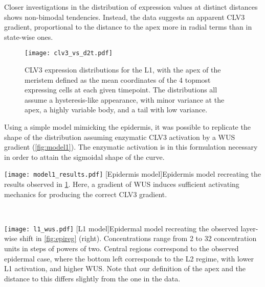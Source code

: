 Closer investigations in the distribution of expression
values at distinct distances shows non-bimodal tendencies. Instead, the data
suggests an apparent CLV3 gradient, proportional to the distance to the apex
more in radial terms than in state-wise ones.

\begin{figure}[H]
  \centering
\texttt{[image: clv3\_vs\_d2t.pdf]}
  \caption[CLV3 distributions]{CLV3 expression distributions for the L1, with the apex of the
    meristem defined as the mean coordinates of the 4 topmost expressing cells
    at each given timepoint. The distributions all assume a hysteresis-like
    appearance, with minor variance at the apex, a highly variable body, and a
    tail with low variance.}
  \label{fig:clv3d2t}
\end{figure}

Using a simple model mimicking the epidermis, it was possible to
replicate the shape of the distribution assuming enzymatic CLV3 activation by a WUS gradient
(\cref{fig:model1}). The enzymatic activation is in this formulation necessary in order to
attain the sigmoidal shape of the curve.




\begin{minipage}{\textwidth}
  \begin{minipage}[t]{0.39\textwidth}
    \centering
    \texttt{[image: model1\_results.pdf]}
    [Epidermis model]{Epidermis model recreating the results
      observed in
      \cref{fig:clv3d2t}. Here, a gradient of WUS induces sufficient
      activating mechanics for producing the correct CLV3 gradient.}
    \label{fig:model1}
  \end{minipage}~~
  \begin{minipage}[t]{.59\textwidth}
    \centering
    \texttt{[image: l1\_wus.pdf]}
    [L1 model]{Epidermal model recreating the observed
      layer-wise shift in \cref{fig:epireg} (right). Concentrations range from
      2 to 32 concentration units in steps of powers of two. Central regions
      correspond to the observed epidermal case, where the bottom left
      corresponds to the L2 regime, with lower L1 activation, and higher WUS.
      Note that our definition of the apex and the distance to this differs
      slightly from the one in the data.}
    \label{fig:model2}
  \end{minipage}
  \vspace{1cm}
\end{minipage}

